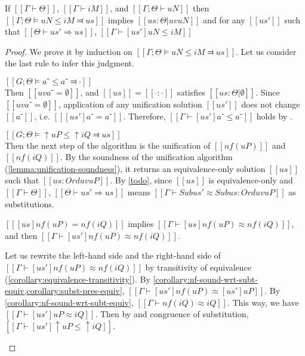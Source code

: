 \begin{lemma} \label{lemma:neg-subt-soundness}
        If $[[Γ ⊢ Θ]]$, $[[Γ ⊢ iM]]$, and $[[Γ ; Θ ⊢ uN]]$ then\\ 
        $[[Γ ; Θ ⊨ uN ≤ iM ⫤ us]]$
        implies $[[us : Θ|uv uN]]$ and 
        for any $[[us']]$ such that $[[Θ ⊢ us' ⇒ us]]$,
        $[[ Γ ⊢ [us']uN ≤ iM ]]$
\end{lemma}
\begin{proof}
    We prove it by induction on $[[Γ ; Θ ⊨ uN ≤ iM ⫤ us]]$.
    Let us consider the last rule to infer this judgment. 
    \begin{caseof}
        \item $[[G;Θ ⊨ a⁻ ≤ a⁻ ⫤ ·]]$\\
        Then $[[uv a⁻ = ∅]]$, and $[[us]] = [[· : ·]]$ satisfies $[[us : Θ|∅]]$.
        Since $[[uv a⁻ = ∅]]$, application of any unification solution $[[us']]$ does not change $[[a⁻]]$, i.e.
        $[[ [us']a⁻ = a⁻ ]]$. Therefore, $[[Γ ⊢ [us']a⁻ ≤ a⁻]]$ holds by .

        \item $[[G;Θ ⊨ ↑uP ≤ ↑iQ ⫤ us]]$\\
        Then the next step of the algorithm is the unification of $[[nf(uP)]]$ and $[[nf(iQ)]]$.
        By the soundness of the unification algorithm (\cref{lemma:unification-soundness}),
        it returns an equivalence-only solution $[[us]]$ such that $[[us : Ord uv uP]]$.
        By \cref{todo}, since $[[us]]$ is equivalence-only and $[[Γ ⊢ Θ]]$, $[[Θ ⊢ us' ⇒ us]]$ means 
        $[[ Γ ⊢ Sub us' ≈ Sub us : Ord uv uP ]]$ as substitutions.

        $[[ [us]nf(uP) = nf(iQ) ]]$ implies $[[Γ ⊢ [us]nf(uP) ≈ nf(iQ)]]$, and then 
        $[[Γ ⊢ [us']nf(uP) ≈ nf(iQ)]]$. 

        Let us rewrite the left-hand side and the right-hand side of $[[Γ ⊢ [us']nf(uP) ≈ nf(iQ)]]$ by 
        transitivity of equivalence (\cref{corollary:equivalence-transitivity}).
        By \cref{corollary:nf-sound-wrt-subt-equiv,corollary:subst-pres-equiv},
        $[[Γ ⊢ [us']nf(uP) ≈ [us']uP ]]$. By \cref{corollary:nf-sound-wrt-subt-equiv}, 
        $[[Γ ⊢ nf(iQ) ≈ iQ ]]$. 
        This way, we have $[[Γ ⊢ [us']uP ≈ iQ]]$.
        Then by 
        and congruence of substitution, $[[Γ ⊢ [us']↑uP ≤ ↑iQ]]$.


\end{caseof}
\end{proof}
